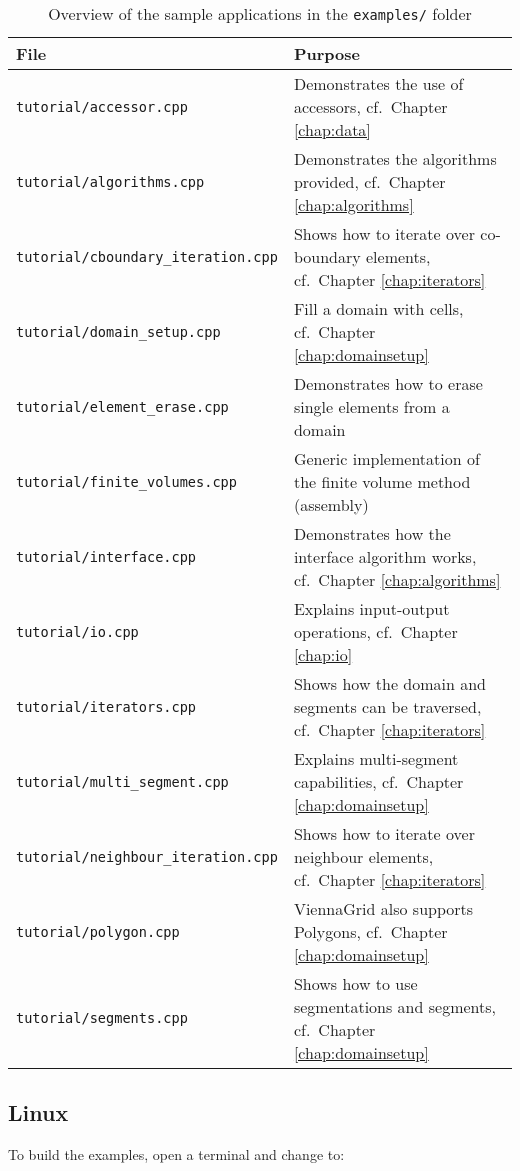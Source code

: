 \begin{table}[tb]
\begin{center}
\begin{tabular}{l|p{9.3cm}}
File & Purpose\\
\hline
\texttt{tutorial/accessor.cpp}              & Demonstrates the use of accessors, cf.~Chapter \ref{chap:data} \\
\texttt{tutorial/algorithms.cpp}            & Demonstrates the algorithms provided, cf.~Chapter \ref{chap:algorithms} \\
\texttt{tutorial/cboundary\_iteration.cpp}  & Shows how to iterate over co-boundary elements, cf.~Chapter \ref{chap:iterators} \\
\texttt{tutorial/domain\_setup.cpp}         & Fill a domain with cells, cf.~Chapter \ref{chap:domainsetup} \\
\texttt{tutorial/element\_erase.cpp}        & Demonstrates how to erase single elements from a domain \\
\texttt{tutorial/finite\_volumes.cpp}       & Generic implementation of the finite volume method (assembly) \\
\texttt{tutorial/interface.cpp}             & Demonstrates how the interface algorithm works, cf.~Chapter \ref{chap:algorithms} \\
\texttt{tutorial/io.cpp}                    & Explains input-output operations, cf.~Chapter \ref{chap:io} \\
\texttt{tutorial/iterators.cpp}             & Shows how the domain and segments can be traversed, cf.~Chapter \ref{chap:iterators} \\
\texttt{tutorial/multi\_segment.cpp}        & Explains multi-segment capabilities, cf.~Chapter \ref{chap:domainsetup} \\
\texttt{tutorial/neighbour\_iteration.cpp}  & Shows how to iterate over neighbour elements, cf.~Chapter \ref{chap:iterators} \\
\texttt{tutorial/polygon.cpp}               & ViennaGrid also supports Polygons, cf.~Chapter \ref{chap:domainsetup} \\
\texttt{tutorial/segments.cpp}              & Shows how to use segmentations and segments, cf.~Chapter \ref{chap:domainsetup}
\end{tabular}
\caption{Overview of the sample applications in the \texttt{examples/} folder}
\label{tab:tutorial-dependencies}
\end{center}
\end{table}

\subsection{Linux}
To build the examples, open a terminal and change to:


